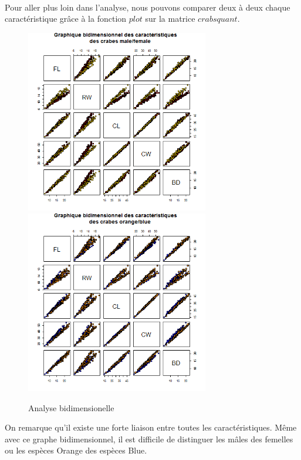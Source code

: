 \documentclass[titlepage]{article}
\begin{document}
\paragraph{}
Pour aller plus loin dans l'analyse, nous pouvons comparer deux à deux chaque caractéristique grâce à la fonction $plot$ sur la matrice $crabsquant$.
\begin{figure}[H]
\label{fig3}
\begin{center}
\includegraphics[width=8cm]{sexe-crabs.png}
\includegraphics[width=8cm]{spicies-crabs.png}
\end{center}
\caption{Analyse bidimensionelle}
\end{figure}
On remarque qu'il existe une forte liaison entre toutes les caractéristiques. Même avec ce graphe bidimensionnel, il est difficile de distinguer les mâles des femelles ou les espèces Orange des espèces Blue.
\end{document}
